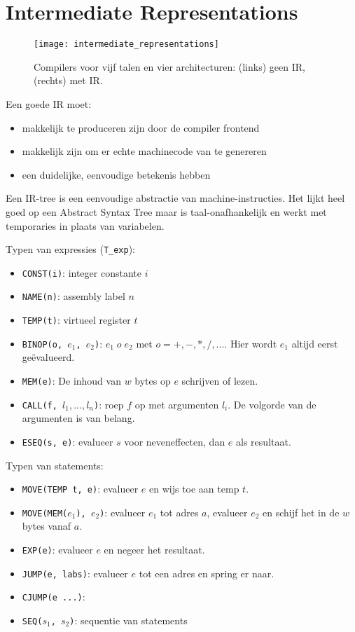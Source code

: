 
\chapter{Intermediate Representations}
\begin{figure}[ht]
	\texttt{[image: intermediate\_representations]}
	\caption{Compilers voor vijf talen en vier architecturen: 
		(links) geen IR, (rechts) met IR.}
	\label{fig:intermediate_representations}
\end{figure}
Een goede IR moet:
\begin{itemize}
	\item makkelijk te produceren zijn door de compiler frontend
	\item makkelijk zijn om er echte machinecode van te genereren
	\item een duidelijke, eenvoudige betekenis hebben
\end{itemize}

Een IR-tree is een eenvoudige abstractie van machine-instructies. Het lijkt heel goed op een Abstract Syntax Tree maar is taal-onafhankelijk en werkt met temporaries in plaats van variabelen.

Typen van expressies (\texttt{T\_exp}):
\begin{itemize}
	\item \texttt{CONST(i)}: integer constante $i$
	\item \texttt{NAME(n)}: assembly label $n$
	\item \texttt{TEMP(t)}: virtueel register $t$
	\item \texttt{BINOP(o, $e_1$, $e_2$)}: $e_1\;o\;e_2$ met $o = +, -, *, /, ...$. Hier wordt $e_1$ altijd eerst geëvalueerd.
	\item \texttt{MEM(e)}: De inhoud van $w$ bytes op $e$ schrijven of lezen.
	\item \texttt{CALL(f, $l_1, ..., l_n$)}: roep $f$ op met argumenten $l_i$. De volgorde van de argumenten is van belang.
	\item \texttt{ESEQ(s, e)}: evalueer $s$ voor neveneffecten, dan $e$ als resultaat.
\end{itemize}

Typen van statements:
\begin{itemize}
	\item \texttt{MOVE(TEMP t, e)}: evalueer $e$ en wijs toe aan temp $t$.
	\item \texttt{MOVE(MEM($e_1$), $e_2$)}: evalueer $e_1$ tot adres $a$, evalueer $e_2$ en schijf het in de $w$ bytes vanaf $a$.
	\item \texttt{EXP(e)}: evalueer $e$ en negeer het resultaat.
	\item \texttt{JUMP(e, labs)}: evalueer $e$ tot een adres en spring er naar. 
	\item \texttt{CJUMP(e ...)}:
	\item \texttt{SEQ($s_1$, $s_2$)}: sequentie van statements 
\end{itemize}

